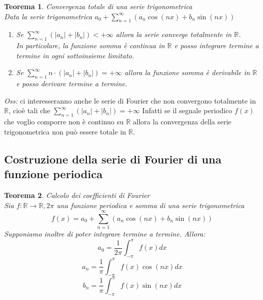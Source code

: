 \documentclass{scrreprt}
\newtheorem{teorema}{Teorema}
\newenvironment{thm}{\begin{mdframed}[backgroundcolor=Ivory2]\begin{teorema}}{\end{teorema}\end{mdframed}}
\begin{document}
\begin{thm}
	Convergenza totale di una serie trigonometrica\\
	Data la serie trigonometrica $a_0 + \sum_{n=1}^\infty \left(a_n \cos(nx) + b_n \sin(nx)\right)$
	\begin{enumerate}
		\item[$i)$] Se $\sum_{n=1}^\infty \left(|a_n| + |b_n|\right) <+\infty$ allora la serie converge totalmente in $\mathbb{R}$.\\
				In particolare, la funzione somma è continua in $\mathbb{R}$ e posso integrare termine a termine in ogni sottoinsieme limitato.
		\item[$ii)$] Se $\sum_{n=1}^\infty n\cdot\left(|a_n| + |b_n|\right) =+\infty$ allora la funzione somma è derivabile in $\mathbb{R}$ e posso derivare termine a termine.
	\end{enumerate}
\end{thm}
\emph{Oss:} ci interesseranno anche le serie di Fourier che non convergono totalmente in $\mathbb{R}$, cioè tali che $\sum_{n=1}^\infty \left(|a_n| + |b_n|\right) =+\infty$
Infatti se il segnale periodico $f(x)$ che voglio comporre non è continuo su $\mathbb{R}$ allora la convergenza della serie trigonometrica non può essere totale in $\mathbb{R}$.

\subsection{Costruzione della serie di Fourier di una funzione periodica}
\begin{thm}
	Calcolo dei coefficienti di Fourier\\
	Sia $f:\mathbb{R}\to\mathbb{R}, 2\pi$ una funzione periodica e somma di una serie trigonometrica
	\begin{equation}
		f(x) = a_0 + \sum_{n=1}^\infty \left(a_n \cos(nx) + b_n \sin(nx)\right)
	\end{equation}
	Supponiamo inoltre di poter integrare termine a termine. Allora:
	\begin{equation}
		a_0 = \frac{1}{2\pi}\int_{-\pi}^\pi f(x)dx
	\end{equation}
	\begin{equation}
		a_n = \frac{1}{\pi}\int_{-\pi}^\pi f(x)\cos(nx)dx
	\end{equation}
	\begin{equation}
		b_n = \frac{1}{\pi}\int_{-\pi}^\pi f(x)\sin(nx)dx
	\end{equation}
\end{thm}
\end{document}
